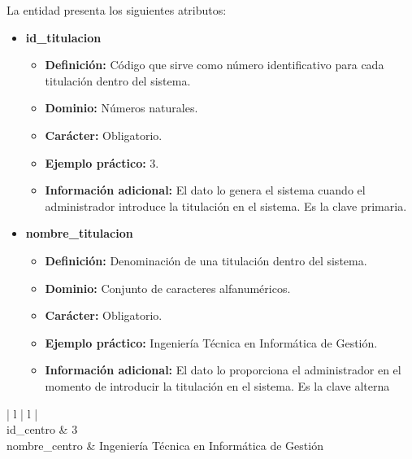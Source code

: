 \begin{description}
   \item[Descripción de los atributos] La entidad presenta los siguientes
   atributos:

   \begin{itemize}
    \item \textbf{id\_titulacion}
      \begin{itemize}
         \item \textbf{Definición:} Código que sirve como número identificativo
         para cada titulación dentro del sistema.
         \item \textbf{Dominio:} Números naturales.
         \item \textbf{Carácter:} Obligatorio.
         \item \textbf{Ejemplo práctico:} 3.
         \item \textbf{Información adicional:} El dato lo genera el sistema
         cuando el administrador introduce la titulación en el sistema.
         Es la clave primaria.
      \end{itemize}
   \item \textbf{nombre\_titulacion}
      \begin{itemize}
         \item \textbf{Definición:} Denominación de una titulación dentro del sistema.
         \item \textbf{Dominio:} Conjunto de caracteres alfanuméricos.
         \item \textbf{Carácter:} Obligatorio.
         \item \textbf{Ejemplo práctico:} Ingeniería Técnica en Informática de Gestión.
         \item \textbf{Información adicional:} El dato lo proporciona el administrador en el momento de introducir la titulación en el sistema. Es la clave alterna
      \end{itemize}
   \end{itemize}

   \item[Ejemplo práctico]

   \item \begin{center}
            \begin{tabular}{ | l | l | }
            \hline
             \\
            \hline
            id\_centro & 3 \\
            \hline
            nombre\_centro & Ingeniería Técnica en Informática de Gestión \\
            \hline
            \end{tabular}
         \end{center}
   \end{description}
